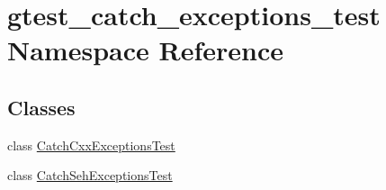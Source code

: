 \hypertarget{namespacegtest__catch__exceptions__test}{}\section{gtest\+\_\+catch\+\_\+exceptions\+\_\+test Namespace Reference}
\label{namespacegtest__catch__exceptions__test}
\subsection*{Classes}
\begin{DoxyCompactItemize}
\item 
class \hyperlink{classgtest__catch__exceptions__test_1_1_catch_cxx_exceptions_test}{Catch\+Cxx\+Exceptions\+Test}
\item 
class \hyperlink{classgtest__catch__exceptions__test_1_1_catch_seh_exceptions_test}{Catch\+Seh\+Exceptions\+Test}
\end{DoxyCompactItemize}

